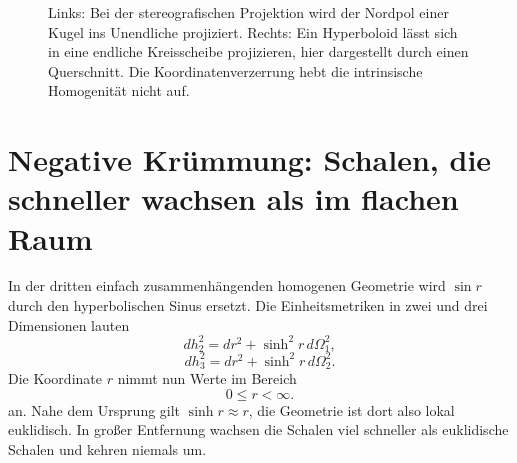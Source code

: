\begin{figure}[htbp]\centering
{}%
\caption{Links: Bei der stereografischen Projektion wird der Nordpol einer Kugel ins Unendliche projiziert. Rechts: Ein Hyperboloid lässt sich in eine endliche Kreisscheibe projizieren, hier dargestellt durch einen Querschnitt. Die Koordinatenverzerrung hebt die intrinsische Homogenität nicht auf.}\label{fig:c03-projections}\end{figure}

\section{Negative Krümmung: Schalen, die schneller wachsen als im flachen Raum}

In der dritten einfach zusammenhängenden homogenen Geometrie wird \(\sin r\) durch den hyperbolischen Sinus ersetzt. Die Einheitsmetriken in zwei und drei Dimensionen lauten
\begin{equation}
dh_2^2 = dr^2 + \sinh^2 r\, d\Omega_1^2,
\label{eq:c03-hyperbolic-two}
\end{equation}
\begin{equation}
dh_3^2 = dr^2 + \sinh^2 r\, d\Omega_2^2.
\label{eq:c03-hyperbolic-three}
\end{equation}
Die Koordinate \(r\) nimmt nun Werte im Bereich
\begin{equation}
0\le r<\infty.
\end{equation}
an. Nahe dem Ursprung gilt \(\sinh r\approx r\), die Geometrie ist dort also lokal euklidisch. In großer Entfernung wachsen die Schalen viel schneller als euklidische Schalen und kehren niemals um.

